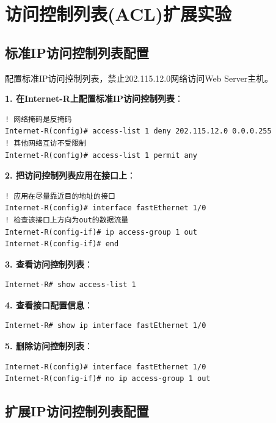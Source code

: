 \documentclass[12pt,a4paper]{ctexart}
\begin{document}
\section{访问控制列表(ACL)扩展实验}

\subsection{标准IP访问控制列表配置}

\begin{exambox}[实验要求]
配置标准IP访问控制列表，禁止202.115.12.0网络访问Web Server主机。
\end{exambox}

\begin{cmdbox}
\textbf{1. 在Internet-R上配置标准IP访问控制列表}：
\begin{lstlisting}
! 网络掩码是反掩码
Internet-R(config)# access-list 1 deny 202.115.12.0 0.0.0.255
! 其他网络互访不受限制
Internet-R(config)# access-list 1 permit any
\end{lstlisting}

\textbf{2. 把访问控制列表应用在接口上}：
\begin{lstlisting}
! 应用在尽量靠近目的地址的接口
Internet-R(config)# interface fastEthernet 1/0
! 检查该接口上方向为out的数据流量
Internet-R(config-if)# ip access-group 1 out
Internet-R(config-if)# end
\end{lstlisting}

\textbf{3. 查看访问控制列表}：
\begin{lstlisting}
Internet-R# show access-list 1
\end{lstlisting}

\textbf{4. 查看接口配置信息}：
\begin{lstlisting}
Internet-R# show ip interface fastEthernet 1/0
\end{lstlisting}

\textbf{5. 删除访问控制列表}：
\begin{lstlisting}
Internet-R(config)# interface fastEthernet 1/0
Internet-R(config-if)# no ip access-group 1 out
\end{lstlisting}
\end{cmdbox}

\subsection{扩展IP访问控制列表配置}
\end{document}

